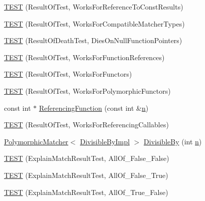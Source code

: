\begin{DoxyCompactItemize}
\item 
\hyperlink{namespacetesting_1_1gmock__matchers__test_a17b952cce22be6338fb1369f886d61c4}{T\+E\+ST} (Result\+Of\+Test, Works\+For\+Reference\+To\+Const\+Results)
\item 
\hyperlink{namespacetesting_1_1gmock__matchers__test_a1aceb307c843f0f5532053e390a7c654}{T\+E\+ST} (Result\+Of\+Test, Works\+For\+Compatible\+Matcher\+Types)
\item 
\hyperlink{namespacetesting_1_1gmock__matchers__test_a4c929e5b46a503a9bb48c8b88dcbbf2a}{T\+E\+ST} (Result\+Of\+Death\+Test, Dies\+On\+Null\+Function\+Pointers)
\item 
\hyperlink{namespacetesting_1_1gmock__matchers__test_a1638ee6460100cbe21c65b6cdc06579a}{T\+E\+ST} (Result\+Of\+Test, Works\+For\+Function\+References)
\item 
\hyperlink{namespacetesting_1_1gmock__matchers__test_a19b7a39915f7ad5a0b741caf7ae4e619}{T\+E\+ST} (Result\+Of\+Test, Works\+For\+Functors)
\item 
\hyperlink{namespacetesting_1_1gmock__matchers__test_a976290e53e319b06c51a94f7e450d765}{T\+E\+ST} (Result\+Of\+Test, Works\+For\+Polymorphic\+Functors)
\item 
const int $\ast$ \hyperlink{namespacetesting_1_1gmock__matchers__test_af3164fc302e0b727c1eb745bdeb959f6}{Referencing\+Function} (const int \&\hyperlink{app_2main_8cpp_acfc02ec89670db29251fda6a66602ce2}{n})
\item 
\hyperlink{namespacetesting_1_1gmock__matchers__test_a00ee08657c9e9e0c306be7b84cd2848c}{T\+E\+ST} (Result\+Of\+Test, Works\+For\+Referencing\+Callables)
\item 
\hyperlink{classtesting_1_1PolymorphicMatcher}{Polymorphic\+Matcher}$<$ \hyperlink{classtesting_1_1gmock__matchers__test_1_1DivisibleByImpl}{Divisible\+By\+Impl} $>$ \hyperlink{namespacetesting_1_1gmock__matchers__test_ac5b1fd3b6a8141c7e83ef6040ed4630f}{Divisible\+By} (int \hyperlink{app_2main_8cpp_acfc02ec89670db29251fda6a66602ce2}{n})
\item 
\hyperlink{namespacetesting_1_1gmock__matchers__test_aa9a60a406d9f495de8c8552abf577dd1}{T\+E\+ST} (Explain\+Match\+Result\+Test, All\+Of\+\_\+\+False\+\_\+\+False)
\item 
\hyperlink{namespacetesting_1_1gmock__matchers__test_a099aebb5417d5bd85e11aefe935ec345}{T\+E\+ST} (Explain\+Match\+Result\+Test, All\+Of\+\_\+\+False\+\_\+\+True)
\item 
\hyperlink{namespacetesting_1_1gmock__matchers__test_a5d386691eaed59994a1d2b65f94b23a9}{T\+E\+ST} (Explain\+Match\+Result\+Test, All\+Of\+\_\+\+True\+\_\+\+False)

\end{DoxyCompactItemize}
